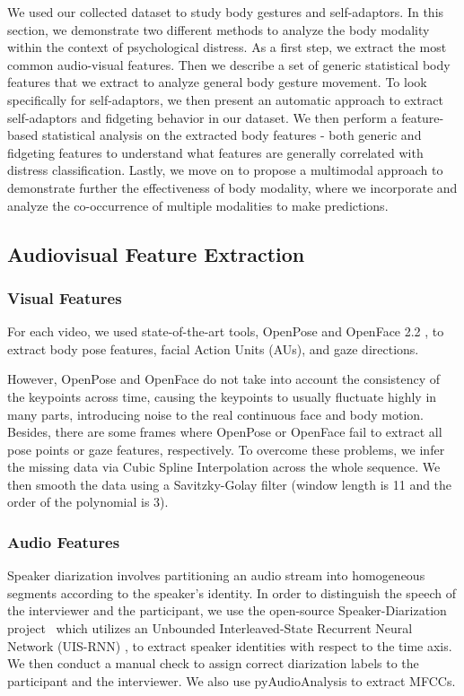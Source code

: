 We used our collected dataset to study body gestures and self-adaptors. In this section, we demonstrate two different methods to analyze the body modality within the context of psychological distress. As a first step, we extract the most common audio-visual features. Then we describe a set of generic statistical body features that we extract to analyze general body gesture movement. To look specifically for self-adaptors, we then present an automatic approach to extract self-adaptors and fidgeting behavior in our dataset. We then perform a feature-based statistical analysis on the extracted body features - both generic and fidgeting features to understand what features are generally correlated with distress classification. Lastly, we move on to propose a multimodal approach to demonstrate further the effectiveness of body modality, where we incorporate and analyze the co-occurrence of multiple modalities to make predictions.







\subsection{Audiovisual Feature Extraction}\label{sec:meta_feature_extraction}
\subsubsection{Visual Features}
\label{sec:visual_features}
For each video, we used state-of-the-art tools, OpenPose \cite{cao2018openpose} and OpenFace 2.2 \cite{baltrusaitis2018openface}, to extract body pose features, facial Action Units (AUs), and gaze directions.

However, OpenPose and OpenFace do not take into account the consistency of the keypoints across time, causing the keypoints to usually fluctuate highly in many parts, introducing noise to the real continuous face and body motion. 
Besides, there are some frames where OpenPose or OpenFace fail to extract all pose points or gaze features, respectively.
To overcome these problems, we infer the missing data via Cubic Spline Interpolation across the whole sequence.
We then smooth the data using a Savitzky-Golay filter \cite{schafer2011savitzky} (window length is 11 and the order of the polynomial is 3). 

\subsubsection{Audio Features}
Speaker diarization involves partitioning an audio stream into homogeneous segments according to the speaker's identity. In order to distinguish the speech of the interviewer and the participant, we use the open-source Speaker-Diarization project~\cite{speakerdiarization} which utilizes an Unbounded Interleaved-State Recurrent Neural Network (UIS-RNN) \cite{zhang2019fully}, to extract speaker identities with respect to the time axis. We then conduct a manual check to assign correct diarization labels to the participant and the interviewer.
We also use pyAudioAnalysis \cite{giannakopoulos2015pyaudioanalysis} to extract MFCCs.


